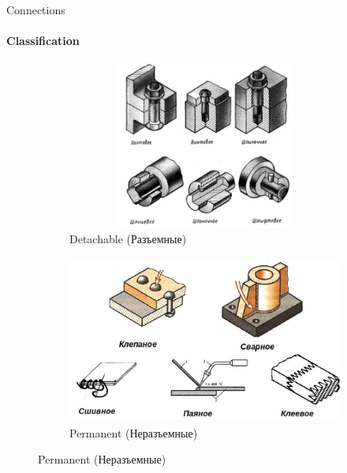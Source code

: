 \documentclass[aspectratio=169]{beamer}
\begin{document}
\begin{frame}[t]{Connections}
    \framesubtitle{Classification}
    \vspace{-0.7cm}
    \begin{figure}[H]
        \begin{subfigure}{0.48\textwidth}
            \centering\includegraphics[height=5.5cm,width=1\textwidth,keepaspectratio]{detach.jpg}
            \caption*{Detachable (Разъемные)}
            \label{fig:detach.jpg}
        \end{subfigure}
        \begin{subfigure}{0.48\textwidth}
            \centering\includegraphics[height=5.5cm,width=1\textwidth,keepaspectratio]{fixed.jpg}
            \caption*{Permanent (Неразъемные)}
            \label{fig:fixed.jpg}
        \end{subfigure}
    \end{figure}
\end{frame}
\end{document}
